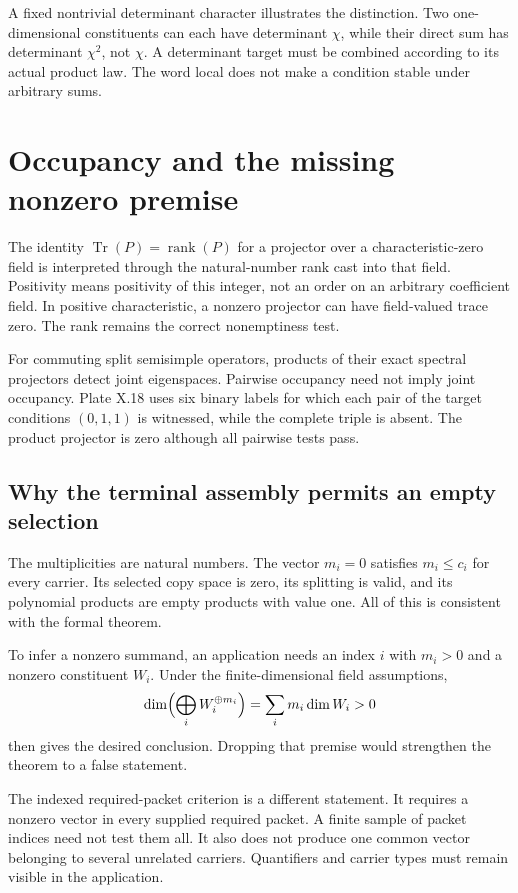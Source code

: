 A fixed nontrivial determinant character illustrates the distinction. Two
one-dimensional constituents can each have determinant $\chi$, while their
direct sum has determinant $\chi^2$, not $\chi$. A determinant target must be
combined according to its actual product law. The word local does not make a
condition stable under arbitrary sums.

\clearpage
\section{Occupancy and the missing nonzero premise}
The identity $\operatorname{Tr}(P)=\operatorname{rank}(P)$ for a projector over a
characteristic-zero field is interpreted through the natural-number rank cast
into that field. Positivity means positivity of this integer, not an order on an
arbitrary coefficient field. In positive characteristic, a nonzero projector can
have field-valued trace zero. The rank remains the correct nonemptiness test.

For commuting split semisimple operators, products of their exact spectral
projectors detect joint eigenspaces. Pairwise occupancy need not imply joint
occupancy. Plate X.18 uses six binary labels for which each pair of the target
conditions $(0,1,1)$ is witnessed, while the complete triple is absent.
The product projector is zero although all pairwise tests pass.

\subsection{Why the terminal assembly permits an empty selection}
The multiplicities are natural numbers. The vector $m_i=0$ satisfies $m_i\le c_i$
for every carrier. Its selected copy space is zero, its splitting is valid, and
its polynomial products are empty products with value one. All of this is
consistent with the formal theorem.

To infer a nonzero summand, an application needs an index $i$ with $m_i>0$ and a
nonzero constituent $W_i$. Under the finite-dimensional field assumptions,
\[
 \dim\Bigl(\bigoplus_i W_i^{\oplus m_i}\Bigr)
       =\sum_i m_i\dim W_i>0
\]
then gives the desired conclusion. Dropping that premise would strengthen the
theorem to a false statement.

The indexed required-packet criterion is a different statement. It requires a
nonzero vector in every supplied required packet. A finite sample of packet
indices need not test them all. It also does not produce one common vector
belonging to several unrelated carriers. Quantifiers and carrier types must
remain visible in the application.

